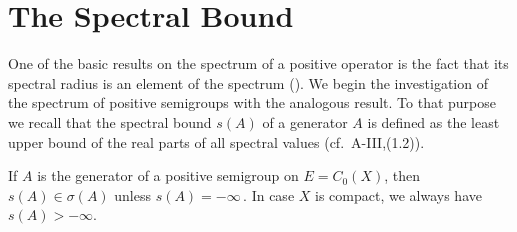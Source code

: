 \section{The Spectral Bound}\label{sec:b3-1}
One of the basic results on the spectrum of a positive operator is the fact that its spectral radius is an element of the spectrum (\citet[V.Proposition~4.1]{schaefer:1974}).
We begin the investigation of the spectrum of positive semigroups with the analogous result.
To that purpose we recall that the spectral bound $s(A)$ of a generator $A$ is defined as the least upper bound of the real parts of all spectral values (cf.\ A-III,(1.2)).
%
%
%
\begin{theorem}\label{thm:b3-1.1}
If $A$ is the generator of a positive semigroup on $E = C_{0}(X)$, then $s(A) \in \sigma(A)$ unless 
$s(A) = -\infty$\,.
In case $X$ is compact, we always have $s(A) > -\infty$.
\end{theorem}
